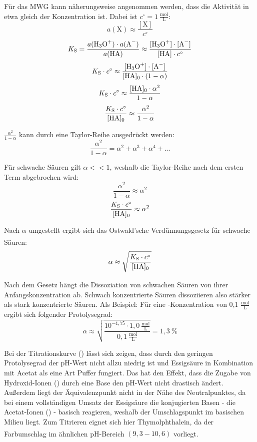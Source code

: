 \documentclass[
	a4paper,										%
	12pt,											%
	twoside,										%
	headsepline,								%
	footsepline,									%
	captions=tableheading,					%
]{scrartcl}
\newcommand{\zitat}[1]{\textsuperscript{\cite{#1}}}
\newcommand{\formel}[2]{				%
	\begin{equation}
		\label{eq: #1}							%
		#2											%
	\end{equation}}
\begin{document}
Für das MWG kann näherungsweise angenommen werden, dass die Aktivität in etwa gleich der Konzentration ist. Dabei ist $c^{\circ} = 1\ \mathrm{\frac{mol}{L}}$:
\formel{n}{a(\mathrm{X}) \approx \frac{[\mathrm{X}]}{c^{\circ}}}
\formel{mwg6}{K_{\mathrm{S}} = \frac{a(\ce{H3O+}) \cdot a({\ce{A-}})}{a(\ce{HA})} \approx \frac{[\ce{H3O+}] \cdot [{\ce{A-}}]}{[\ce{HA}] \cdot c^{\circ}}}
\formel{mwg7}{K_{\mathrm{S}} \cdot c^{\circ} \approx \frac{[\ce{H3O+}] \cdot [{\ce{A-}}]}{[\ce{HA}]_{0} \cdot (1-\alpha)}}
\formel{mwg8}{K_{\mathrm{S}} \cdot c^{\circ} \approx \frac{[\ce{HA}]_{0} \cdot \alpha^2}{1-\alpha}}
\formel{mwg8}{\frac{K_{\mathrm{S}} \cdot c^{\circ}}{[\ce{HA}]_{0}}\approx \frac{\alpha^2}{1-\alpha}}

$\frac{\alpha^2}{1-\alpha}$ kann durch eine Taylor-Reihe ausgedrückt werden:
\formel{taylor}{\frac{\alpha^2}{1-\alpha} = \alpha^2 + \alpha^3 + \alpha^4 + ...}

Für schwache Säuren gilt $\alpha << 1$, weshalb die Taylor-Reihe nach dem ersten Term abgebrochen wird:
\formel{taylor2}{\frac{\alpha^2}{1-\alpha} \approx \alpha^{2}}
\formel{mwg9}{\frac{K_{\mathrm{S}} \cdot c^{\circ}}{[\ce{HA}]_{0}} \approx \alpha^2}

Nach $\alpha$ umgestellt ergibt sich das Ostwald'sche Verdünnungsgesetz für schwache Säuren\zitat{alpha}:
\formel{ost}{\alpha \approx \sqrt{\frac{K_{\mathrm{S}} \cdot c^{\circ}}{[\ce{HA}]_{0}}}}

Nach dem Gesetz hängt die Dissoziation von schwachen Säuren von ihrer Anfangskonzentration ab.
Schwach konzentrierte Säuren dissoziieren also stärker als stark konzentrierte Säuren.
Als Beispiel: Für eine -Konzentration von 0,1 $\mathrm{\frac{mol}{L}}$ ergibt sich folgender Protolysegrad:
\formel{bsp}{\alpha \approx \sqrt{\frac{10^{-4,75} \cdot 1,0\ \mathrm{\frac{mol}{L}}}{0,1\ \mathrm{\frac{mol}{L}}}} = 1,3\ \%}

Bei der Titrationskurve () lässt sich zeigen, dass durch den geringen Protolysegrad der pH-Wert nicht allzu niedrig ist und Essigsäure in Kombination mit Acetat als eine Art Puffer fungiert.
Das hat den Effekt, dass die Zugabe von Hydroxid-Ionen () durch eine Base den pH-Wert nicht drastisch ändert.
Außerdem liegt der Äquivalenzpunkt nicht in der Nähe des Neutralpunktes,
da bei einem vollständigen Umsatz der Essigsäure die konjugierten Basen - die Acetat-Ionen () - basisch reagieren,
weshalb der Umschlagspunkt im basischen Milieu liegt. Zum Titrieren eignet sich hier Thymolphthalein, da der Farbumschlag im ähnlichen pH-Bereich $(9,3 - 10,6)$ vorliegt.\zitat{tym}
\end{document}
